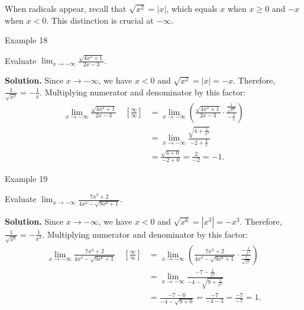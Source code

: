 \bigskip

When radicals appear, recall that \(\sqrt{x^{2}} = |x|\), which equals \(x\) when \(x \ge 0\) and \(-x\) when \(x < 0\). This distinction is crucial at \(-\infty\).


\begin{examplebox}{Example 18}

Evaluate \(\displaystyle\lim_{x \to -\infty} \frac{\sqrt{4x^{2} + 1}}{2x - 3}\).

\medskip
\textbf{Solution.}
Since \(x \to -\infty\), we have \(x < 0\) and \(\sqrt{x^{2}} = |x| = -x\). Therefore, \(\frac{1}{\sqrt{x^{2}}} = -\frac{1}{x}\).
Multiplying numerator and denominator by this factor:
\begin{align*}
\lim_{x \to -\infty} \frac{\sqrt{4x^{2} + 1}}{2x - 3} \quad \left[\frac{\infty}{\infty}\right]
    &= \lim_{x \to -\infty} \left( \frac{\sqrt{4x^{2} + 1}}{2x - 3} \cdot \frac{\frac{1}{\sqrt{x^{2}}}}{-\frac{1}{x}} \right) \\[10pt]
    &= \lim_{x \to -\infty} \frac{\sqrt{4 + \frac{1}{x^{2}}}}{-2 + \frac{3}{x}} \\[10pt]
    &= \frac{\sqrt{4 + 0}}{-2 + 0}
     = \frac{2}{-2}
     = -1.
\end{align*}
\end{examplebox}


\begin{examplebox}{Example 19}

Evaluate \(\displaystyle\lim_{x \to -\infty} \frac{7x^{3} + 2}{4x^{3} - \sqrt{9x^{6} + 1}}\).

\medskip
\textbf{Solution.}
Since \(x \to -\infty\), we have \(x < 0\) and \(\sqrt{x^{6}} = |x^{3}| = -x^{3}\). Therefore, \(\frac{1}{\sqrt{x^{6}}} = -\frac{1}{x^{3}}\).
Multiplying numerator and denominator by this factor:
\begin{align*}
\lim_{x \to -\infty} \frac{7x^{3} + 2}{4x^{3} - \sqrt{9x^{6} + 1}} \quad \left[\frac{\infty}{\infty}\right]
    &= \lim_{x \to -\infty} \left( \frac{7x^{3} + 2}{4x^{3} - \sqrt{9x^{6} + 1}} \cdot \frac{-\frac{1}{x^{3}}}{\frac{1}{\sqrt{x^{6}}}} \right) \\[10pt]
    &= \lim_{x \to -\infty} \frac{-7 - \frac{2}{x^{3}}}{-4 - \sqrt{9 + \frac{1}{x^{6}}}} \\[10pt]
    &= \frac{-7 - 0}{-4 - \sqrt{9 + 0}}
     = \frac{-7}{-4 - 3}
     = \frac{-7}{-7}
     = 1.
\end{align*}
\end{examplebox}


